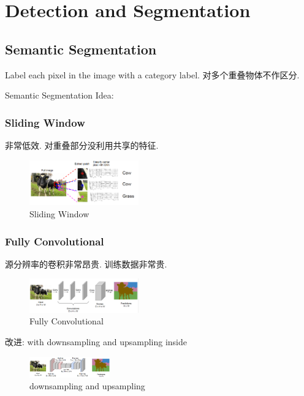 \newpage
\section{Detection and Segmentation}

\subsection{Semantic Segmentation}
Label each pixel in the image with a category label. 对多个重叠物体不作区分.

Semantic Segmentation Idea:

\subsubsection{Sliding Window}
非常低效. 对重叠部分没利用共享的特征. 
\begin{figure}[!htb]
    \centering
    \includegraphics[width=0.42\textwidth]{pic/Lec11/sliding window.png}
    \caption{Sliding Window}
\end{figure}
\subsubsection{Fully Convolutional}
源分辨率的卷积非常昂贵. 训练数据非常贵. 
\begin{figure}[!htb]
    \centering
    \includegraphics[width=0.42\textwidth]{pic/Lec11/Fully Convolutional.png}
    \caption{Fully Convolutional}
\end{figure}
    
改进: with downsampling and upsampling inside
\begin{figure}[!htb]
    \centering
    \includegraphics[width=0.309\textwidth]{pic/Lec11/downsampling and upsampling.png}
    \caption{downsampling and upsampling}
\end{figure}
    
